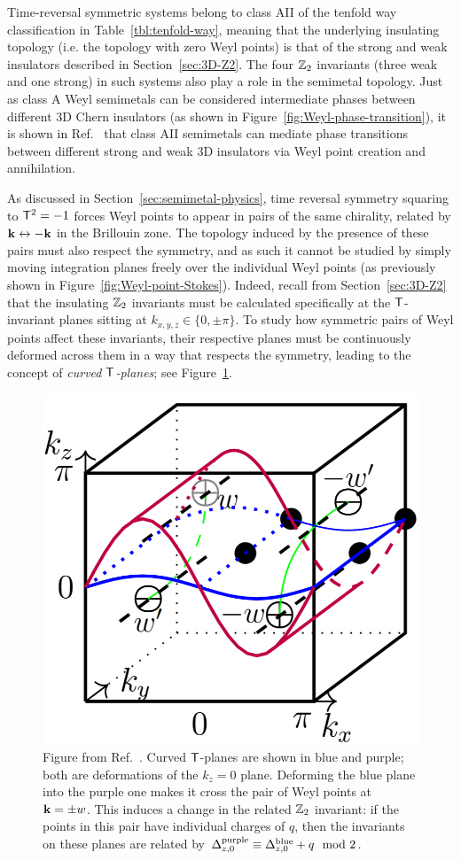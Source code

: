 Time-reversal symmetric systems belong to class AII of the tenfold way classification in Table~\ref{tbl:tenfold-way}, meaning that the underlying insulating topology (i.e. the topology with zero Weyl points) is that of the strong and weak insulators described in Section~\ref{sec:3D-Z2}. The four $\mathbb{Z}_2$ invariants (three weak and one strong) in such systems also play a role in the semimetal topology. Just as class A Weyl semimetals can be considered intermediate phases between different 3D Chern insulators (as shown in Figure~\ref{fig:Weyl-phase-transition}), it is shown in Ref.~\cite{Thiang_equivariant} that class AII semimetals can mediate phase transitions between different strong and weak 3D insulators via Weyl point creation and annihilation.

As discussed in Section~\ref{sec:semimetal-physics}, time reversal symmetry squaring to $\mathsf{T}^2=-1$ forces Weyl points to appear in pairs of the same chirality, related by $\vb{k}\leftrightarrow-\vb{k}$ in the Brillouin zone. The topology induced by the presence of these pairs must also respect the symmetry, and as such it cannot be studied by simply moving integration planes freely over the individual Weyl points (as previously shown in Figure~\ref{fig:Weyl-point-Stokes}). Indeed, recall from Section~\ref{sec:3D-Z2} that the insulating $\mathbb{Z}_2$ invariants must be calculated specifically at the $\mathsf{T}$-invariant planes sitting at $k_{x,y,z}\in\{0,\pm\pi\}$. To study how symmetric pairs of Weyl points affect these invariants, their respective planes must be continuously deformed across them in a way that respects the symmetry, leading to the concept of \emph{curved $\mathsf{T}$-planes}; see Figure~\ref{fig:T-planes}.
\begin{figure}[htb!]
	\centering
	\includegraphics[width=.5\linewidth]{Images/T-planes}
	\caption{Figure from Ref.~\cite{Thiang_equivariant}. Curved $\mathsf{T}$-planes are shown in blue and purple; both are deformations of the $k_z=0$ plane. Deforming the blue plane into the purple one makes it cross the pair of Weyl points at $\vb{k}=\pm w$. This induces a change in the related $\mathbb{Z}_2$ invariant: if the points in this pair have individual charges of $q$, then the invariants on these planes are related by $\Delta_{z,0}^{\rm purple} \equiv \Delta_{z,0}^{\rm blue} + q \mod 2$.}
	\label{fig:T-planes}
\end{figure}

